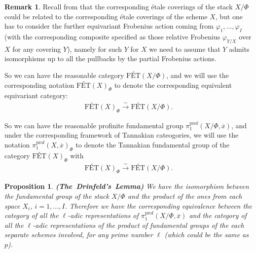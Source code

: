 \documentclass[11pt]{book}
\newtheorem{proposition}[theorem]{Proposition}
\theoremstyle{definition}
\newtheorem{remark}[theorem]{Remark}
\numberwithin{equation}{section}
\begin{document}
\begin{remark}
Recall from \cite[Sheaves, Stacks and Shtukas, Definition 4.2.10]{perf} that the corresponding \'etale coverings of the stack $X/\Phi$ could be related to the corresponding \'etale coverings of the scheme $X$, but one has to consider the further equivariant Frobenius action coming from $\varphi_1,...,\varphi_I$ (with the corresponding composite specified as those relative Frobenius $\varphi_{Y/X}$ over $X$ for any covering $Y $), namely for such $Y$ for $X$ we need to assume that $Y$ admits isomorphisms up to all the pullbacks by the partial Frobenius actions. 	
\end{remark}


\indent So we can have the reasonable category $\text{F\'ET}(X/\Phi)$, and we will use the corresponding notation $\text{F\'ET}(X)_{\Phi}$ to denote the corresponding equivalent equivariant category:
\begin{align}
\text{F\'ET}(X)_{\Phi}	\overset{\sim}{\longrightarrow} \text{F\'ET}(X/\Phi).
\end{align}


\indent So we can have the reasonable profinite fundamental group $\pi_1^\mathrm{prof}(X/\Phi,\overline{x})$, and under the corresponding framework of Tannakian cateogories, we will use the notation $\pi_1^\mathrm{prof}(X,\overline{x})_\Phi$ to denote the Tannakian fundamental group of the category $\text{F\'ET}(X)_{\Phi}$ with
\begin{align}
\text{F\'ET}(X)_{\Phi}	\overset{\sim}{\longrightarrow} \text{F\'ET}(X/\Phi).
\end{align}


\begin{proposition} \mbox{\bf{(The Drinfeld's Lemma)}}
We have the isomorphism between the fundamental group of the stack $X/\Phi$ and the product of the ones from each space $X_i$, $i=1,...,I$. Therefore we have the corresponding equivalence between the category of all the $\ell$-adic representations of $\pi_1^\mathrm{prof}(X/\Phi,\overline{x})$	and the category of all the $\ell$-adic representations of the product of fundamental groups of the each separate schemes involved, for any prime number $\ell$ (which could be the same as $p$).
\end{proposition}
\end{document}
